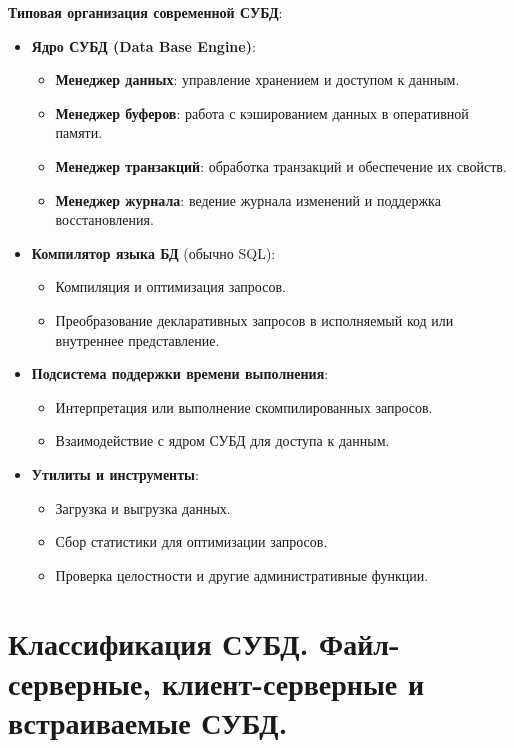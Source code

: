 \documentclass[a4paper,12pt]{article}
\begin{document}
\textbf{Типовая организация современной СУБД}:

\begin{itemize}
    \item \textbf{Ядро СУБД (Data Base Engine)}:
    \begin{itemize}
        \item \textbf{Менеджер данных}: управление хранением и доступом к данным.
        \item \textbf{Менеджер буферов}: работа с кэшированием данных в оперативной памяти.
        \item \textbf{Менеджер транзакций}: обработка транзакций и обеспечение их свойств.
        \item \textbf{Менеджер журнала}: ведение журнала изменений и поддержка восстановления.
    \end{itemize}
    \item \textbf{Компилятор языка БД} (обычно SQL):
    \begin{itemize}
        \item Компиляция и оптимизация запросов.
        \item Преобразование декларативных запросов в исполняемый код или внутреннее представление.
    \end{itemize}
    \item \textbf{Подсистема поддержки времени выполнения}:
    \begin{itemize}
        \item Интерпретация или выполнение скомпилированных запросов.
        \item Взаимодействие с ядром СУБД для доступа к данным.
    \end{itemize}
    \item \textbf{Утилиты и инструменты}:
    \begin{itemize}
        \item Загрузка и выгрузка данных.
        \item Сбор статистики для оптимизации запросов.
        \item Проверка целостности и другие административные функции.
    \end{itemize}
\end{itemize}

\section{Классификация СУБД. Файл-серверные, клиент-серверные и встраиваемые СУБД.}
\end{document}
